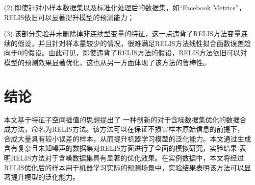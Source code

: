 \documentclass[12pt,a4paper]{article}%
\begin{document}
	(2).即使针对小样本数据集以及标准化处理后的数据集，如“Facebook Metrics”，RELIS依旧可以显著提升模型的预测能力；

	(3).该部分实验并未删除掉非连续型变量的特征，这一点违背了RELIS方法变量连续的假设，并且针对样本量较少的情况，很难满足RELIS方法线性拟合函数误差趋向于0的假设。由此可见，即使违背了RELIS方法的假设，RELIS方法依旧可以对模型的预测效果显著优化，这也从另一方面体现了该方法的鲁棒性。


	\section{结论}
	本文基于特征子空间插值的思想提出了 一种创新的对于含噪数据集优化的数据合成方法，命名为RELIS方法。该方法可以在保证不损害样本原始信息的前提下，
	合成大量具有较小误差的样本，从而提升机器学习模型的泛化能力。本文通过生成含有复杂且未知噪声的数据集对RELIS方面进行了全面的模拟研究，实验结果
	表明RELIS方法对于含噪数据集具有显著的优化效果。在实例数据中，本文将经过RELIS优化后的样本用于机器学习实际的预测场景中，实验结果表明该方法可以显著提升模型的泛化能力。

	
	
	\newpage
\end{document}
